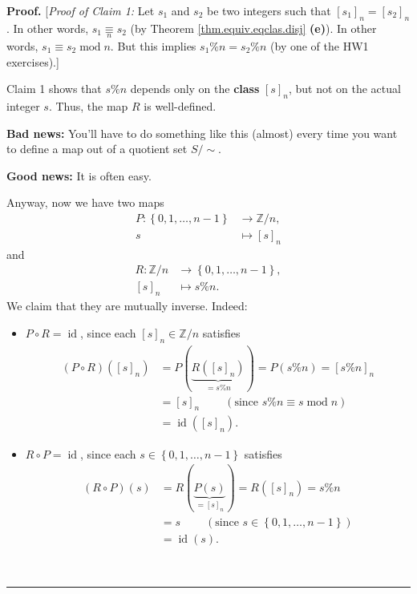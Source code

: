 \documentclass[numbers=enddot,12pt,final,onecolumn,notitlepage]{scrartcl}%
\newcounter{exer}
\numberwithin{exer}{subsection}
\theoremstyle{definition}
\newenvironment{proof}[1][Proof]{\noindent\textbf{#1.} }{\ \rule{0.5em}{0.5em}}
\begin{document}
\begin{proof}
[\textit{Proof of Claim 1:} Let $s_{1}$ and $s_{2}$ be two integers such that
$\left[  s_{1}\right]  _{n}=\left[  s_{2}\right]  _{n}$. In other words,
$s_{1}\underset{n}{\equiv}s_{2}$ (by Theorem \ref{thm.equiv.eqclas.disj}
\textbf{(e)}). In other words, $s_{1}\equiv s_{2}\operatorname{mod}n$. But
this implies $s_{1}\%n=s_{2}\%n$ (by one of the HW1 exercises).]

Claim 1 shows that $s\%n$ depends only on the \textbf{class} $\left[
s\right]  _{n}$, but not on the actual integer $s$. Thus, the map $R$ is well-defined.

\textbf{Bad news:} You'll have to do something like this (almost) every time
you want to define a map out of a quotient set $S/\sim$.

\textbf{Good news:} It is often easy.

Anyway, now we have two maps%
\begin{align*}
P:\left\{  0,1,\ldots,n-1\right\}    & \rightarrow\mathbb{Z}/n,\\
s  & \mapsto\left[  s\right]  _{n}%
\end{align*}
and%
\begin{align*}
R:\mathbb{Z}/n  & \rightarrow\left\{  0,1,\ldots,n-1\right\}  ,\\
\left[  s\right]  _{n}  & \mapsto s\%n.
\end{align*}
We claim that they are mutually inverse. Indeed:

\begin{itemize}
\item $P\circ R=\operatorname*{id}$, since each $\left[  s\right]  _{n}%
\in\mathbb{Z}/n$ satisfies%
\begin{align*}
\left(  P\circ R\right)  \left(  \left[  s\right]  _{n}\right)    & =P\left(
\underbrace{R\left(  \left[  s\right]  _{n}\right)  }_{=s\%n}\right)
=P\left(  s\%n\right)  =\left[  s\%n\right]  _{n}\\
& =\left[  s\right]  _{n}\ \ \ \ \ \ \ \ \ \ \left(  \text{since }s\%n\equiv
s\operatorname{mod}n\right)  \\
& =\operatorname*{id}\left(  \left[  s\right]  _{n}\right)  .
\end{align*}


\item $R\circ P=\operatorname*{id}$, since each $s\in\left\{  0,1,\ldots
,n-1\right\}  $ satisfies%
\begin{align*}
\left(  R\circ P\right)  \left(  s\right)    & =R\left(  \underbrace{P\left(
s\right)  }_{=\left[  s\right]  _{n}}\right)  =R\left(  \left[  s\right]
_{n}\right)  =s\%n\\
& =s\ \ \ \ \ \ \ \ \ \ \left(  \text{since }s\in\left\{  0,1,\ldots
,n-1\right\}  \right)  \\
& =\operatorname*{id}\left(  s\right)  .
\end{align*}


\end{itemize}
\end{proof}
\end{document}
